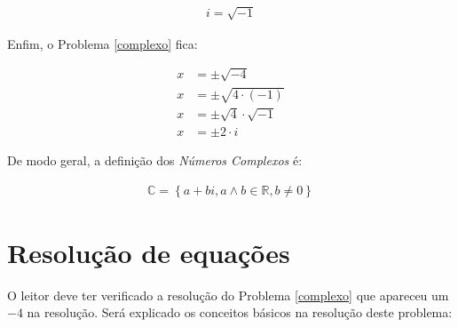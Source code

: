 \begin{ceqn}
	\begin{align*}
	i = \sqrt{-1}		
	\end{align*}
\end{ceqn}

\indent Enfim, o Problema \ref{complexo} fica:

\begin{ceqn}
	\begin{align*}
	x &= \pm \sqrt{-4} \\
	x &= \pm \sqrt{4 \cdot (-1)} \\
	x &= \pm \sqrt{4} \cdot \sqrt{-1} \\
	x &= \pm 2 \cdot i
	\end{align*}
\end{ceqn}

\indent De modo geral, a definição dos \textit{Números Complexos} é:

\begin{ceqn}
	\begin{align*}
	\mathbb{C} = \left\{ a+bi, a \wedge b \in \mathbb{R}, b\neq 0 \right\}
	\end{align*}
\end{ceqn}


\section{Resolução de equações}

\indent O leitor deve ter verificado a resolução do Problema \ref{complexo} que apareceu um $-4$ na resolução. Será explicado os conceitos básicos na resolução deste problema:

